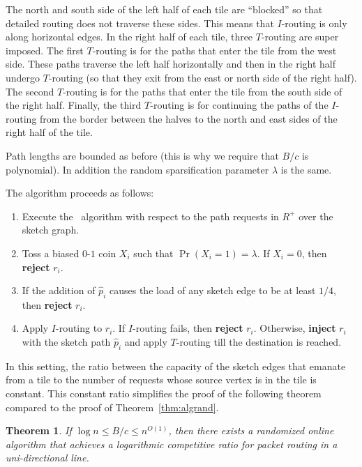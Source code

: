 \documentclass[11pt]{article}
\newtheorem{theorem}{Theorem}
\newcommand{\route}{\text{\sc{ipp}}}
\newenvironment{proof sketch}[1]{\noindent {\emph{Proof sketch of #1:}}}{\hfill \qed}
\begin{document}
The north and south side of the left half of each tile are ``blocked'' so that
detailed routing does not traverse these sides.  This means that $I$-routing is only
along horizontal edges.  In the right half of each tile, three $T$-routing are super
imposed. The first $T$-routing is for the paths that enter the tile from the west
side. These paths traverse the left half horizontally and then in the right half
undergo $T$-routing (so that they exit from the east or north side of the right
half).  The second $T$-routing is for the paths that enter the tile from the south
side of the right half. Finally, the third $T$-routing is for continuing the paths of
the $I$-routing from the border between the halves to the north and east sides of
the right half of the tile.

Path lengths are bounded as before (this is why we require
that $B/c$ is polynomial).  In addition the random
sparsification parameter $\lambda$ is the same.

The algorithm proceeds as follows:
\begin{enumerate}
\item Execute the \route\ algorithm with respect to the path requests in $R^+$ over
  the sketch graph.

\item \label{line:toss 2} Toss a biased $0$-$1$ coin $X_i$ such that $\Pr
  (X_i=1)=\lambda$. If $X_i=0$, then \textbf{reject} $r_i$.

\item
\label{line:load 2}\label{item:quarter 2}
If the addition of $\hat p_i$ causes the load of any sketch edge to be at least
$1/4$, then \textbf{reject} $r_i$.

\item\label{line:I 2} Apply $I$-routing to $r_i$.  If $I$-routing fails, then
  \textbf{reject} $r_i$. Otherwise, \textbf{inject} $r_i$ with the sketch path $\hat
  p_i$ and apply $T$-routing till the destination is reached.
\end{enumerate}

In this setting, the ratio between the capacity of the sketch edges that emanate from
a tile to the number of requests whose source vertex is in the tile is constant. This
constant ratio simplifies the proof of the following theorem compared to the proof of
Theorem~\ref{thm:algrand}.

\begin{theorem}
  If $\log n\leq B/c\leq n^{O(1)}$, then there exists a randomized online algorithm
  that achieves a logarithmic competitive ratio for packet routing in a
  uni-directional line.
\end{theorem}
\end{document}
